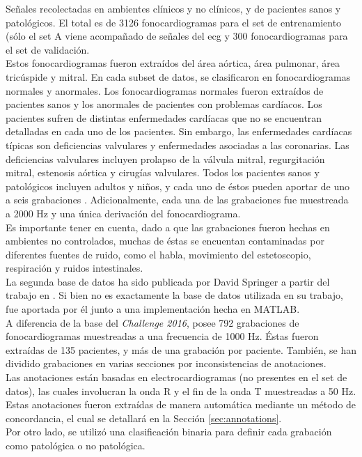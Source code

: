 \indent Señales recolectadas en ambientes clínicos y no clínicos, y de pacientes sanos y patológicos. El total es de
3126 fonocardiogramas para el set de entrenamiento (sólo el set A viene acompañado de señales del \gls{ecg} y
300 fonocardiogramas para el set de validación. \\
\indent Estos fonocardiogramas fueron extraídos del área aórtica, área pulmonar, área tricúspide y mitral. En cada
subset de datos, se clasificaron en fonocardiogramas normales y anormales. Los fonocardiogramas normales fueron
extraídos de pacientes sanos y los anormales de pacientes con problemas cardíacos. Los pacientes sufren de distintas
enfermedades cardíacas que no se encuentran detalladas en cada uno de los pacientes. Sin embargo, las enfermedades
cardíacas típicas son deficiencias valvulares y enfermedades asociadas a las coronarias. Las deficiencias valvulares
incluyen prolapso de la válvula mitral, regurgitación mitral, estenosis aórtica y cirugías valvulares. Todos los
pacientes sanos y patológicos incluyen adultos y niños, y cada uno de éstos pueden aportar de uno a seis grabaciones
. Adicionalmente, cada una de las grabaciones fue muestreada a 2000 Hz y una única derivación del fonocardiograma. \\
\indent Es importante tener en cuenta, dado a que las grabaciones fueron hechas en ambientes no controlados, muchas
de éstas se encuentan contaminadas por diferentes fuentes de ruido, como el habla, movimiento del estetoscopio,
respiración y ruidos intestinales. \\
\indent La segunda base de datos ha sido publicada por David Springer a partir del trabajo en \cite{pp:springer2015}
. Si bien no es exactamente la base de datos utilizada en su trabajo, fue aportada por él junto a una implementación
hecha en \textsc{MATLAB\texttrademark}. \\
\indent A diferencia de la base del \textit{Challenge 2016}, posee 792 grabaciones de fonocardiogramas muestreadas a
una frecuencia de 1000 Hz. Éstas fueron extraídas de 135 pacientes, y más de una grabación por paciente. También, se
han dividido grabaciones en varias secciones por inconsistencias de anotaciones. \\
\indent Las anotaciones están basadas en electrocardiogramas (no presentes en el set de datos), las cuales
involucran la onda R y el fin de la onda T muestreadas a 50 Hz. Estas anotaciones fueron extraídas de manera
automática mediante un método de concordancia, el cual se detallará en la Sección \ref{sec:annotations}. \\
\indent Por otro lado, se utilizó una clasificación binaria para definir cada grabación como patológica o no
patológica.

